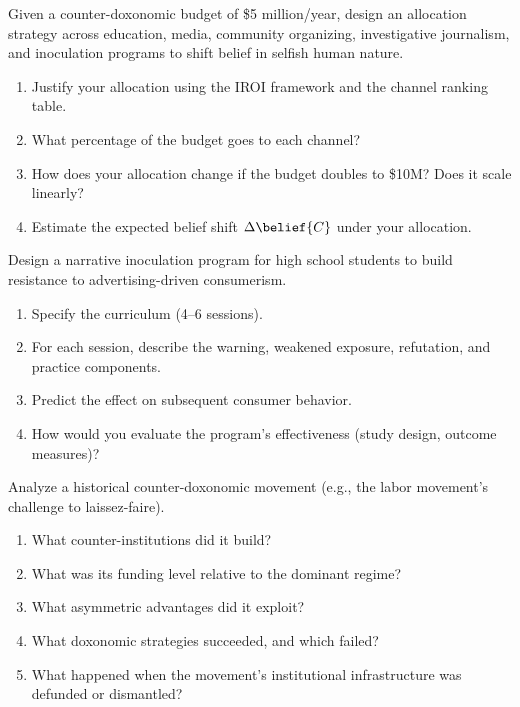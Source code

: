 \begin{exercise}
Given a counter-doxonomic budget of \$5 million/year, design an allocation strategy across education, media, community organizing, investigative journalism, and inoculation programs to shift belief in selfish human nature.
\begin{enumerate}[nosep]
  \item Justify your allocation using the IROI framework and the channel ranking table.
  \item What percentage of the budget goes to each channel?
  \item How does your allocation change if the budget doubles to \$10M? Does it scale linearly?
  \item Estimate the expected belief shift $\Delta\belief{C}$ under your allocation.
\end{enumerate}
\end{exercise}

\begin{exercise}
Design a narrative inoculation program for high school students to build resistance to advertising-driven consumerism.
\begin{enumerate}[nosep]
  \item Specify the curriculum (4--6 sessions).
  \item For each session, describe the warning, weakened exposure, refutation, and practice components.
  \item Predict the effect on subsequent consumer behavior.
  \item How would you evaluate the program's effectiveness (study design, outcome measures)?
\end{enumerate}
\end{exercise}

\begin{exercise}
Analyze a historical counter-doxonomic movement (e.g., the labor movement's challenge to laissez-faire).
\begin{enumerate}[nosep]
  \item What counter-institutions did it build?
  \item What was its funding level relative to the dominant regime?
  \item What asymmetric advantages did it exploit?
  \item What doxonomic strategies succeeded, and which failed?
  \item What happened when the movement's institutional infrastructure was defunded or dismantled?
\end{enumerate}
\end{exercise}

